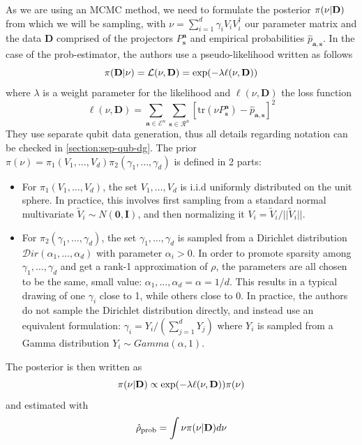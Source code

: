 \documentclass[12pt]{memoir}
\newcommand{\tr}{\text{tr}}
\newcommand{\mb}{\mathbf}
\newcommand{\tb}{\textbf}
\begin{document}
As we are using an MCMC method, we need to formulate the posterior $\pi(\nu | \tb D)$ from which we will be sampling, with $\nu = \sum_{i=1}^d \gamma_i V_i V_i^\dagger$ our parameter matrix and the data $\mb D$ comprised of the projectors $P^{\mb a}_{\mb s}$ and empirical probabilities $\hat p_{\mb a,\mb s}$. In the case of the prob-estimator, the authors use a pseudo-likelihood written as follows
\begin{equation}
    \pi(\tb D| \nu) = \mathcal{L}(\nu, \mb D) = \exp(-\lambda \ell(\nu,\mb D))
\end{equation}
where $\lambda$ is a weight parameter for the likelihood and $\ell(\nu, \mb D)$ the loss function
\begin{equation}
    \ell(\nu, \mb D) = \sum_{\mb a \in \mathcal{E}^n} \sum_{\mb s \in \mathcal{R}^n} \left[\tr(\nu P^{\mb a}_{\mb s}) - \hat p_{\mb a,\mb s}\right]^2
\end{equation}\medbreak
They use separate qubit data generation, thus all details regarding notation can be checked in \ref{section:sep-qub-dg}.
The prior $\pi(\nu) = \pi_1(V_1, \dots, V_d) \pi_2(\gamma_1, \dots, \gamma_d)$ is defined in 2 parts:
\begin{itemize}
    \item For $\pi_1(V_1, \dots, V_d)$, the set $V_1, \dots, V_d$ is i.i.d uniformly distributed on the unit sphere. In practice, this involves first sampling from a standard normal multivariate $\tilde V_i \sim N(\mb 0, \mb I)$, and then normalizing it $V_i = \tilde V_i/||\tilde V_i||$.
    \item For $\pi_2(\gamma_1, \dots, \gamma_d)$, the set $\gamma_1,\dots,\gamma_d$ is sampled from a Dirichlet distribution $\mathcal{D}ir(\alpha_1,\dots,\alpha_d)$ with parameter $\alpha_i > 0$. In order to promote sparsity among $\gamma_1, \dots, \gamma_d$ and get a rank-1 approximation of $\rho$, the parameters are all chosen to be the same, small value: $\alpha_1,\dots,\alpha_d = \alpha = 1/d$. This results in a typical drawing of one $\gamma_i$ close to 1, while others close to 0. In practice, the authors do not sample the Dirichlet distribution directly, and instead use an equivalent formulation: $\gamma_i = Y_i/(\sum_{j=1}^{d} Y_j)$ where $Y_i$ is sampled from a Gamma distribution $Y_i \sim Gamma(\alpha, 1)$.   
\end{itemize}
The posterior is then written as 
\begin{equation}
    \pi(\nu|\tb D) \propto \exp(-\lambda\ell(\nu, \mb D)) \pi(\nu)
\end{equation}
and estimated with 
\begin{equation}
    \hat \rho_{\text{prob}} = \int \nu \pi(\nu|\tb D) d\nu
\end{equation}
\end{document}
